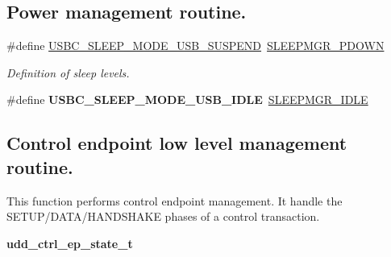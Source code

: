 \subsection*{Power management routine.}
\begin{DoxyCompactItemize}
\item 
\hypertarget{group__udd__xmega__usb__group_gaf5ca2932775dabb853197df18706c469}{\#define \hyperlink{group__udd__xmega__usb__group_gaf5ca2932775dabb853197df18706c469}{U\-S\-B\-C\-\_\-\-S\-L\-E\-E\-P\-\_\-\-M\-O\-D\-E\-\_\-\-U\-S\-B\-\_\-\-S\-U\-S\-P\-E\-N\-D}~\hyperlink{group__sleepmgr__group_ggaa990bc3ea16fcad09009cdc70dbc38c6a1807014e0e226d5b21cfc12d5061c8d0}{S\-L\-E\-E\-P\-M\-G\-R\-\_\-\-P\-D\-O\-W\-N}}\label{group__udd__xmega__usb__group_gaf5ca2932775dabb853197df18706c469}

\begin{DoxyCompactList}\small\item\em Definition of sleep levels. \end{DoxyCompactList}\item 
\hypertarget{group__udd__xmega__usb__group_ga90aeabbf00db4be8f0a1feef5cf0bbb3}{\#define {\bfseries U\-S\-B\-C\-\_\-\-S\-L\-E\-E\-P\-\_\-\-M\-O\-D\-E\-\_\-\-U\-S\-B\-\_\-\-I\-D\-L\-E}~\hyperlink{group__sleepmgr__group_ggaa990bc3ea16fcad09009cdc70dbc38c6ae4f3742b3532d5ebabef6f26fabf4487}{S\-L\-E\-E\-P\-M\-G\-R\-\_\-\-I\-D\-L\-E}}\label{group__udd__xmega__usb__group_ga90aeabbf00db4be8f0a1feef5cf0bbb3}

\end{DoxyCompactItemize}
\subsection*{Control endpoint low level management routine.}
\label{_amgrpc60f904f933dd5c177261b92bc2abc62}%
 This function performs control endpoint management. It handle the S\-E\-T\-U\-P/\-D\-A\-T\-A/\-H\-A\-N\-D\-S\-H\-A\-K\-E phases of a control transaction. \begin{DoxyCompactItemize}
\item 
\hypertarget{group__udd__xmega__usb__group_gabc925782d47feeb37f6f943579038b84}{{\bfseries udd\-\_\-ctrl\-\_\-ep\-\_\-state\-\_\-t}}\label{group__udd__xmega__usb__group_gabc925782d47feeb37f6f943579038b84}

\end{DoxyCompactItemize}
